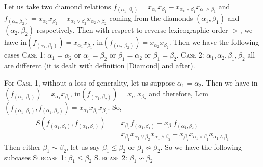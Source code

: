 \documentclass[10pt,reqno]{amsart}
\numberwithin{equation}{section}
\begin{document}
 Let us take two diamond relations $f_{(\alpha_1,\beta_1)}=x_{\alpha_1}x_{\beta_1}-x_{\alpha_1 \vee \beta_1}
x_{\alpha_1 \wedge \beta_1}$ and $f_{(\alpha_2,\beta_2)}=x_{\alpha_2}x_{\beta_2}-x_{\alpha_2 \vee \beta_2}
x_{\alpha_2 \wedge \beta_2}$ coming from the diamonds $(\alpha_1,\beta_1)$ and $(\alpha_2,\beta_2)$ respectively. Then
with respect to reverse lexicographic order $>$, we have in$(f_{(\alpha_1,\beta_1)})=x_{\alpha_1}x_{\beta_1}$,
in$(f_{(\alpha_2,\beta_2)})=x_{\alpha_2}x_{\beta_2}$. Then we have the following cases
\vskip 1mm \noindent
\textsc{Case 1:} $\alpha_1=\alpha_2$ or $\alpha_1=\beta_2$ or $\beta_1=\alpha_2$ or $\beta_1=\beta_2$.
\vskip 1mm \noindent
\textsc{Case 2:} $\alpha_1,\alpha_2,\beta_1,\beta_2$ all are different (it is dealt with definition \ref{Diamond} and after).

 For \textsc{Case 1}, without a loss of generality, let us suppose $\alpha_1=\alpha_2$. Then we have 
in$(f_{(\alpha_1,\beta_1)})=x_{\alpha_1}x_{\beta_1}$, in$(f_{(\alpha_1,\beta_2)})=x_{\alpha_1}x_{\beta_2}$ and therefore,
Lcm$(f_{(\alpha_1,\beta_1)},f_{(\alpha_1,\beta_2)})=x_{\alpha_1}x_{\beta_1}x_{\beta_2}$. So,
\begin{align*}
 S(f_{(\alpha_1,\beta_1)},f_{(\alpha_1,\beta_2)})=&x_{\beta_2}f_{(\alpha_1,\beta_1)}- x_{\beta_1}f_{(\alpha_1,\beta_2)}\\
 =& x_{\beta_1}x_{\alpha_1 \vee \beta_2}x_{\alpha_1 \wedge \beta_2}- x_{\beta_2}x_{\alpha_1 \vee \beta_1}
 x_{\alpha_1 \wedge \beta_1}
\end{align*}
Then either $\beta_1 \sim \beta_2$, let us say $\beta_1 \leq \beta_2$ or $\beta_1 \nsim \beta_2$. So we have the following subcases
\vskip 1mm \noindent
\textsc{Subcase 1:} $\beta_1 \leq \beta_2$
\vskip 1mm \noindent
\textsc{Subcase 2:} $\beta_1 \nsim \beta_2$
\end{document}

